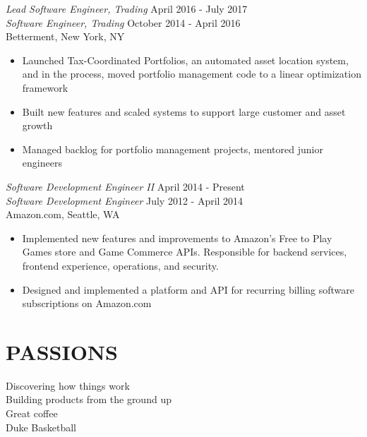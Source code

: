 \documentclass[line,margin]{res}
\begin{document}
\begin{resume}
    {\sl Lead Software Engineer, Trading} \hfill April 2016 - July 2017 \\
    {\sl Software Engineer, Trading} \hfill October 2014 - April 2016 \\
        Betterment, New York, NY
        \begin{itemize}  \itemsep -2pt %
            \item Launched Tax-Coordinated Portfolios, an automated asset location system, and in the process, moved portfolio management code to a linear optimization framework
            \item Built new features and scaled systems to support large customer and asset growth
            \item Managed backlog for portfolio management projects, mentored junior engineers
        \end{itemize}

    {\sl Software Development Engineer II} \hfill April 2014 - Present \\
    {\sl Software Development Engineer} \hfill July 2012 - April 2014 \\
        Amazon.com, Seattle, WA
        \begin{itemize}  \itemsep -2pt %
            \item Implemented new features and improvements to Amazon's Free to Play Games store and Game Commerce APIs. Responsible for backend services, frontend experience, operations, and security.
            \item Designed and implemented a platform and API for recurring billing software subscriptions on Amazon.com
        \end{itemize}

\section{PASSIONS}
    Discovering how things work \\
    Building products from the ground up \\
    Great coffee \\
    Duke Basketball
                
\end{resume}
\end{document}
